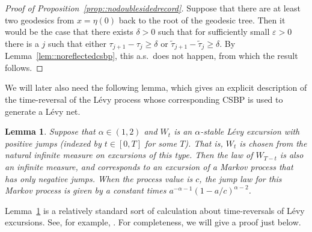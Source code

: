 \documentclass[JEP,XML,SOM,Unicode]{cedram}
\let\epsilon\varepsilon
\theoremstyle{plain}
\numberwithin{theorem}{section}
\newtheorem{lemma}[theorem]{Lemma}
\theoremstyle{definition}
\let\wt\widetilde
\begin{document}
\begin{proof}[Proof of Proposition~\ref{prop::nodoublesidedrecord}]
Suppose that there are at least two geodesics from $x=\eta(0)$ back to the root of the geodesic tree. Then it would be the case that there exists $\delta > 0$ such that for sufficiently small $\epsilon > 0$ there is a $j$ such that either $\tau_{j+1}-\tau_j \geq \delta$ or $\wt{\tau}_{j+1}-\wt{\tau}_j \geq \delta$. By Lemma~\ref{lem::noreflectedcsbp}, this a.s.\ does not happen, from which the result follows.
\end{proof}

We will later also need the following lemma, which gives an explicit description of the time-reversal of the Lévy process whose corresponding CSBP is used to generate a Lévy net.

\begin{lemma}
\label{lem::levyreversal}
Suppose that $\alpha \in (1,2)$ and $W_t$ is an $\alpha$-stable Lévy excursion with positive jumps (indexed by $t \in [0,T]$ for some $T$). That is, $W_t$ is chosen from the natural infinite measure on excursions of this type. Then the law of $W_{T-t}$ is also an infinite measure, and corresponds to an excursion of a Markov process that has only negative jumps. When the process value is $c$, the jump law for this Markov process is given by a constant times $a^{-\alpha-1} (1-a/c)^{\alpha - 2}$.
\end{lemma}

Lemma~\ref{lem::levyreversal} is a relatively standard sort of calculation about time-reversals of Lévy excursions. See, for example, \cite[Th.\,4]{ch1996levy}. For completeness, we will give a proof just below.
\end{document}
